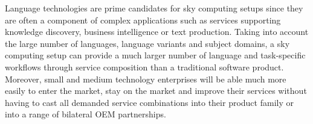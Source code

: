\documentclass[10pt, plain]{../../metanetpaper}
\begin{document}
\begin{multicols}{2}
Language technologies are prime candidates for sky computing setups since they are often a component of complex applications such as services supporting knowledge discovery, business intelligence or text production. Taking into account the large number of languages, language variants and subject domains, a sky computing setup can provide a much larger number of language and task-specific workflows through service composition than a traditional software product. Moreover, small and medium technology enterprises will be able much more easily to enter the market, stay on the market and improve their services without having to cast all demanded service combinations into their product family or into a range of bilateral OEM partnerships.
\end{multicols}

\clearpage


\end{document}
